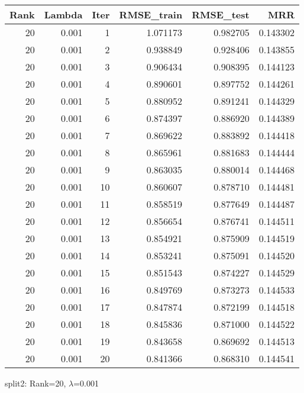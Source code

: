 \begin{tabular}{rrrrrr}
\toprule
 Rank &  Lambda &  Iter &  RMSE\_train &  RMSE\_test &       MRR \\
\midrule
   20 &   0.001 &     1 &    1.071173 &   0.982705 &  0.143302 \\
   20 &   0.001 &     2 &    0.938849 &   0.928406 &  0.143855 \\
   20 &   0.001 &     3 &    0.906434 &   0.908395 &  0.144123 \\
   20 &   0.001 &     4 &    0.890601 &   0.897752 &  0.144261 \\
   20 &   0.001 &     5 &    0.880952 &   0.891241 &  0.144329 \\
   20 &   0.001 &     6 &    0.874397 &   0.886920 &  0.144389 \\
   20 &   0.001 &     7 &    0.869622 &   0.883892 &  0.144418 \\
   20 &   0.001 &     8 &    0.865961 &   0.881683 &  0.144444 \\
   20 &   0.001 &     9 &    0.863035 &   0.880014 &  0.144468 \\
   20 &   0.001 &    10 &    0.860607 &   0.878710 &  0.144481 \\
   20 &   0.001 &    11 &    0.858519 &   0.877649 &  0.144487 \\
   20 &   0.001 &    12 &    0.856654 &   0.876741 &  0.144511 \\
   20 &   0.001 &    13 &    0.854921 &   0.875909 &  0.144519 \\
   20 &   0.001 &    14 &    0.853241 &   0.875091 &  0.144520 \\
   20 &   0.001 &    15 &    0.851543 &   0.874227 &  0.144529 \\
   20 &   0.001 &    16 &    0.849769 &   0.873273 &  0.144533 \\
   20 &   0.001 &    17 &    0.847874 &   0.872199 &  0.144518 \\
   20 &   0.001 &    18 &    0.845836 &   0.871000 &  0.144522 \\
   20 &   0.001 &    19 &    0.843658 &   0.869692 &  0.144513 \\
   20 &   0.001 &    20 &    0.841366 &   0.868310 &  0.144541 \\
\bottomrule
\end{tabular}

\caption{split2: Rank=20, $\lambda$=0.001}
